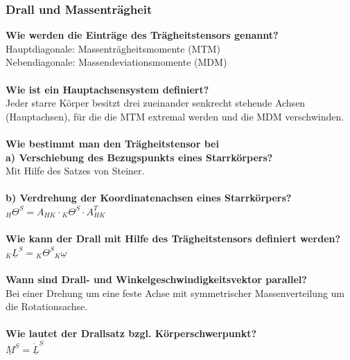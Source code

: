 \documentclass[a4paper,twocolumn,10pt]{article}
\begin{document}
\subsubsection{Drall und Massenträgheit}
\textbf{Wie werden die Einträge des Trägheitstensors genannt?}\\
Hauptdiagonale: Massenträgheitsmomente (MTM)\\
Nebendiagonale: Massendeviationsmomente (MDM)\\\\
\textbf{Wie ist ein Hauptachsensystem definiert?}\\
Jeder starre Körper besitzt drei zueinander senkrecht stehende Achsen (Hauptachsen), für die die MTM extremal werden und die MDM verschwinden.\\\\
\textbf{Wie bestimmt man den Trägheitstensor bei}\\
\textbf{a) Verschiebung des Bezugspunkts eines Starrkörpers?}\\
Mit Hilfe des Satzes von Steiner.\\\\
\textbf{b) Verdrehung der Koordinatenachsen eines Starrkörpers?}\\
${}_H\Theta^S=A_{HK}\cdot {}_K\Theta^S\cdot A_{HK}^T$\\\\
\textbf{Wie kann der Drall mit Hilfe des Trägheitstensors definiert werden?}\\
${}_K\underline{L}^S={}_K\Theta^S {}_K\underline{\omega}$\\\\
\textbf{Wann sind Drall- und Winkelgeschwindigkeitsvektor parallel?}\\
Bei einer Drehung um eine feste Achse mit symmetrischer Massenverteilung um die Rotationsachse.\\\\
\textbf{Wie lautet der Drallsatz bzgl. Körperschwerpunkt?}\\
$\underline{M}^S=\underline{\dot{L}}^S$
\end{document}
